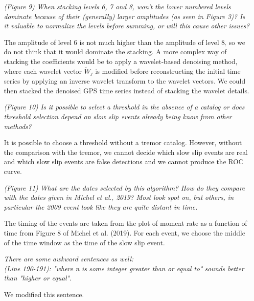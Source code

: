 \documentclass[letterpaper, 12pt]{article}
\begin{document}
\bigskip

\textit{(Figure 9) When stacking levels 6, 7 and 8, won't the lower numbered levels dominate because of their (generally) larger amplitudes (as seen in Figure 3)? Is it valuable to normalize the levels before summing, or will this cause other issues?}

\bigskip

The amplitude of level 6 is not much higher than the amplitude of level 8, so we do not think that it would dominate the stacking. A more complex way of stacking the coefficients would be to apply a wavelet-based denoising method, where each wavelet vector $\widetilde{W}_j$ is modified before reconstructing the initial time series by applying an inverse wavelet transform to the wavelet vectors. We could then stacked the denoised GPS time series instead of stacking the wavelet details.

\bigskip

\textit{(Figure 10) Is it possible to select a threshold in the absence of a catalog or does threshold selection depend on slow slip events already being know from other methods?}

\bigskip

It is possible to choose a threshold without a tremor catalog. However, without the comparison with the tremor, we cannot decide which slow slip events are real and which slow slip events are false detections and we cannot produce the ROC curve.

\bigskip

\textit{(Figure 11) What are the dates selected by this algorithm? How do they compare with the dates given in Michel et al., 2019? Most look spot on, but others, in particular the 2009 event look like they are quite distant in time.}

\bigskip

The timing of the events are taken from the plot of moment rate as a function of time from Figure 8 of Michel et al. (2019). For each event, we choose the middle of the time window as the time of the slow slip event.

\bigskip

\textit{There are some awkward sentences as well:} \\

\textit{ (Line 190-191): "where n is some integer greater than or equal to" sounds better than "higher or equal".}

\bigskip

We modified this sentence.
\end{document}
